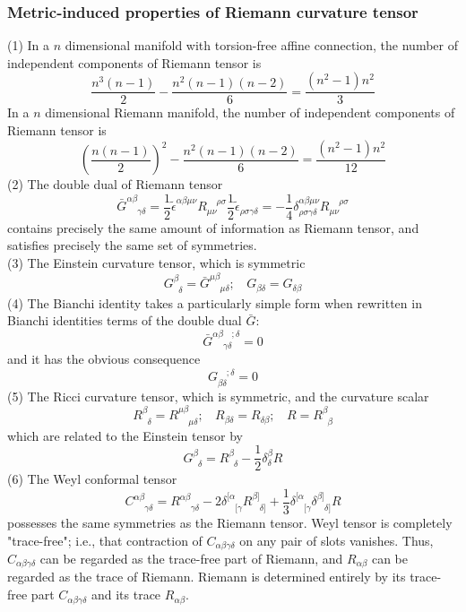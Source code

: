 \documentclass{article}
\begin{document}
\subsubsection{Metric-induced properties of Riemann curvature tensor}
(1) In a $n$ dimensional manifold with torsion-free affine connection, the number of independent components of Riemann tensor is \[\frac{n^3(n-1)}{2} - \frac{n^2(n-1)(n-2)}{6} = \frac{(n^2-1)n^2}{3}\]
In a $n$ dimensional Riemann manifold,  the number of independent components of Riemann tensor is \[(\frac{n(n-1)}{2})^2 -\frac{n^2(n-1)(n-2)}{6} = \frac{(n^2-1)n^2}{12} \]
(2) The double dual of Riemann tensor
\[\bar{G}^{\alpha \beta}_{\phantom{\alpha \beta} \gamma \delta} = \frac{1}{2} \tilde{\epsilon}^{\alpha \beta \mu \nu} R_{\mu \nu}^{\phantom{\mu \nu} \rho \sigma} \frac{1}{2} \tilde{\epsilon}_{\rho \sigma \gamma \delta} = -\frac{1}{4} \delta^{\alpha \beta \mu \nu}_{\rho \sigma \gamma \delta} R_{\mu \nu}^{\phantom{\mu \nu} \rho \sigma} \]
contains precisely the same amount of information as
Riemann tensor, and satisfies precisely the same set of symmetries.\\
(3) The Einstein curvature tensor, which is symmetric
\[G^{\beta}_{\phantom{\beta}\delta} = \bar{G}^{\mu \beta}_{\phantom{\mu \beta} \mu \delta}; \ \ \ \ G_{\beta \delta}=G_{\delta \beta}\]
(4) The Bianchi identity takes a particularly simple form when rewritten in Bianchi identities terms of the double dual $\bar{G}$:
\[\bar{G}^{\alpha \beta \phantom{\gamma \delta};\delta}_{\phantom{\alpha \beta} \gamma \delta} = 0\]
and it has the obvious consequence
\[G_{\beta \delta}^{\phantom{\beta \delta};\delta} = 0\]
(5) The Ricci curvature tensor, which is symmetric, and the curvature scalar
\[R^{\beta}_{\phantom{\beta}\delta} = R^{\mu \beta}_{\phantom{\mu \beta} \mu \delta}; \ \ \ \ R_{\beta \delta}=R_{\delta \beta}; \ \ \  \ R = R^{\beta}_{\phantom{\beta}\beta}\]
which are related to the Einstein tensor by 
\[G^{\beta}_{\phantom{\beta}\delta} =  R^{\beta}_{\phantom{\beta}\delta} - \frac{1}{2} \delta^{\beta}_{\delta}R\]
(6) The Weyl conformal tensor
\[C^{\alpha \beta}_{\phantom{\alpha \beta} \gamma \delta} = R^{\alpha \beta}_{\phantom{\alpha \beta} \gamma \delta} -2 \delta^{[\alpha}_{\phantom{[\alpha}[\gamma} R^{\beta]}_{\phantom{\beta]}\delta]} + \frac{1}{3} \delta^{[\alpha}_{\phantom{[\alpha}[\gamma} \delta^{\beta]}_{\phantom{\beta]}\delta]} R \]
possesses the same symmetries as the Riemann tensor. 
Weyl tensor is completely "trace-free"; i.e., that
contraction of $C_{\alpha \beta \gamma \delta}$ on any pair of slots vanishes. Thus, $C_{\alpha \beta \gamma \delta}$ can be regarded as the trace-free part of Riemann, and $R_{\alpha \beta}$ can be regarded as the trace of Riemann. Riemann is determined entirely by its trace-free part $C_{\alpha \beta \gamma \delta}$ and
its trace $R_{\alpha \beta}$.
\end{document}
